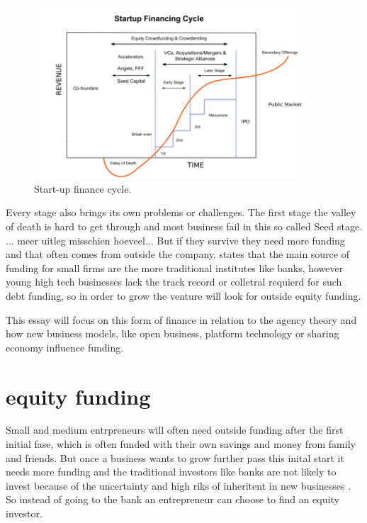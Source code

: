 \documentclass[a4paper, 11pt]{article}
\begin{document}
\begin{figure}[h!]
    \centering
    \includegraphics[width=0.9\textwidth]{FinCycle.png}
    \caption{Start-up finance cycle.}
    \label{fig:graph1}
\end{figure}

Every stage also brings its own problems or challenges. The first stage the valley of death is hard to get through and most business fail in this so called Seed stage.
... meer uitleg misschien hoeveel... But if they survive they need more funding and that often comes from outside the company. \cite{casson2008oxford} states that the main source of funding for small firms are the more traditional institutes like banks, however young high tech businesses lack the track record or colletral requierd for such debt funding, so in order to grow the venture will look for outside equity funding.

This essay will focus on this form of finance in relation to the agency theory and how new business models, like open business, platform technology or sharing economy influence funding.

\section{equity funding}

Small and medium entrpreneurs will often need outside funding after the first initial fase, which is often funded with their own savings and money from family and friends. But once a business wants to grow further pass this inital start it needs more funding and the traditional investors like banks are not likely to invest because of the uncertainty and high riks of inheritent in new businesses \citep{Osnabrugge2000}. So instead of going to the bank an entrepreneur can choose to find an equity investor.
\end{document}

